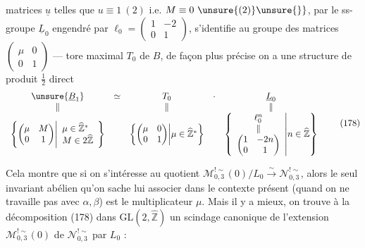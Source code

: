 matrices \unsure{$\{$} $\underline u$  telles que $u\equiv1\ (2)$ i.e. $M\equiv0\ \unsure{(2)}\unsure{\}}$, par le ss-groupe  $\underline L_0$ engendré par $\ell_0=\begin{pmatrix}1&-2\\0&1\end{pmatrix}$, s'identifie au groupe des matrices $\begin{pmatrix}\mu&0\\0&1\end{pmatrix}$ ---  tore maximal $T_0$ de $B$, de façon plus précise on a une structure de produit $\frac12$ direct
\[
\begin{array}{ccccc}
\unsure{\underline B_1}&\simeq&T_0&\cdot&\underline L_0\\
\Vert&&\Vert&&\Vert\\
\left\{\begin{pmatrix}\mu&M\\0&1\end{pmatrix}\middle|\begin{array}{l}\mu\in\widehat{\mathbb Z}^{*}\\M\in2\widehat{\mathbb Z}\end{array}\right\}&&
\left\{\begin{pmatrix}\mu&0\\0&1\end{pmatrix}\middle|\mu\in\widehat{\mathbb Z}^{*}\right\}&&
\left\{\begin{array}{c}\ell_0^n\\\Vert\\\begin{pmatrix}1&-2n\\0&1\end{pmatrix}\end{array}\middle|n\in\widehat{\mathbb Z}\right\}
\end{array}
\tag{178}
\]

Cela montre que si on s'intéresse au quotient $\mathcal M_{0,3}^{!\sim}(0)/L_0\xrightarrow{\sim}\mathcal N_{0,3}^{!\sim}$, alors le seul invariant abélien qu'on sache lui associer dans le contexte présent (quand on ne travaille pas avec $\alpha,\beta$) est le multiplicateur $\mu$. Mais il y a mieux, on trouve  à la décomposition (178) dans $\mathrm{GL}(2,\widehat{\mathbb Z})$ un scindage canonique de l'extension $\mathcal M_{0,3}^{!\sim}(0)$ de $\mathcal N_{0,3}^{!\sim}$ par $L_0$ :

